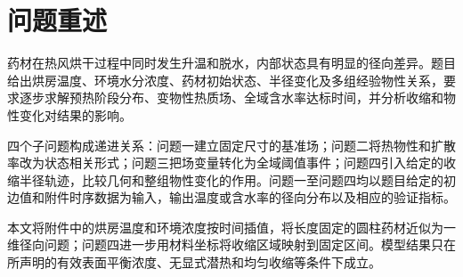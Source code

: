 \section{问题重述}

药材在热风烘干过程中同时发生升温和脱水，内部状态具有明显的径向差异。题目给出烘房温度、环境水分浓度、药材初始状态、半径变化及多组经验物性关系，要求逐步求解预热阶段分布、变物性热质场、全域含水率达标时间，并分析收缩和物性变化对结果的影响。

四个子问题构成递进关系：问题一建立固定尺寸的基准场；问题二将热物性和扩散率改为状态相关形式；问题三把场变量转化为全域阈值事件；问题四引入给定的收缩半径轨迹，比较几何和整组物性变化的作用。问题一至问题四均以题目给定的初边值和附件时序数据为输入，输出温度或含水率的径向分布以及相应的验证指标。

本文将附件中的烘房温度和环境浓度按时间插值，将长度固定的圆柱药材近似为一维径向问题；问题四进一步用材料坐标将收缩区域映射到固定区间。模型结果只在所声明的有效表面平衡浓度、无显式潜热和均匀收缩等条件下成立。
